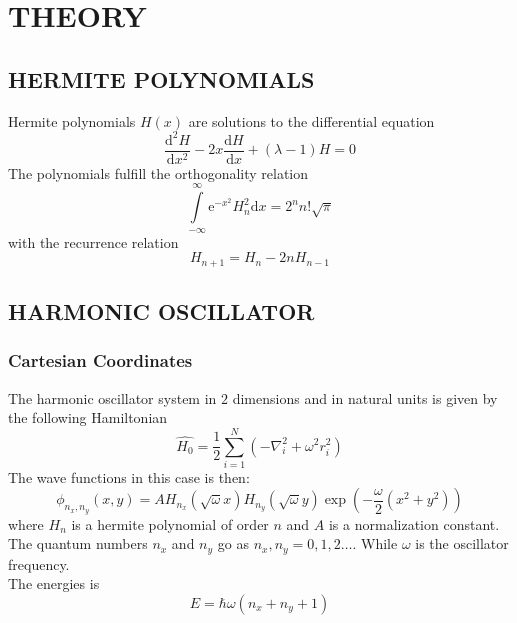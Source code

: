 \documentclass[a4paper, hidelinks, 10pt]{article}
\let\oldsection\section
\renewcommand{\section}[1]{\centering \oldsection{{#1}} \justifying}
\let\oldsubsection\subsection
\renewcommand{\subsection}[1]{\centering \oldsubsection{{#1}} \justifying}
\newcommand{\me}{\mathrm{e}} %
\newcommand{\md}{\mathrm{d}} %
\newcommand{\infint}{\int\limits^{\infty}_{-\infty}}
\begin{document}
\section{THEORY}
\label{sec:theory}

\subsection{HERMITE POLYNOMIALS}
\label{sub:hermite_polynomials}
    Hermite polynomials $H(x)$ are solutions to the differential equation
        \begin{equation}
            \frac{\md^2 H}{\md x^2} -2x\frac{\md H}{\md x} + \left(\lambda
            -1\right)H = 0
            \label{eq:hermitediffeq}
        \end{equation}
    The polynomials fulfill the orthogonality relation 
        \begin{equation}
            \infint \me^{-x^2}H^2_n\md x = 2^nn!\sqrt{\pi}
            \label{eq:hermiteOrth}
        \end{equation}
    with the recurrence relation
        \begin{equation}
            H_{n+1} = H_n - 2nH_{n-1}
            \label{eq:hermiteReq}
        \end{equation}

\subsection{HARMONIC OSCILLATOR}
\label{sub:harmonic_oscillator}
\subsubsection{Cartesian Coordinates}
\label{ssub:Cartesian Coordinates}
    The harmonic oscillator system in $2$ dimensions and in natural units is
    given by the following Hamiltonian
        \begin{equation}
            \hat{H_0} = \frac{1}{2}\sum^N_{i=1}\left(-\nabla^2_i + \omega^2
            r^2_i\right)
            \label{eq:cartHarmOsc}
        \end{equation}
    The wave functions in this case is then:
        \begin{equation}
            \phi_{n_x,n_y}(x,y) =
            AH_{n_x}(\sqrt{\omega}x)H_{n_y}(\sqrt{\omega}y)
            \exp(-\frac{\omega}{2}(x^2+y^2))
            \label{eq:cartUarmOscWavef}
        \end{equation}
    where $H_n$ is a hermite polynomial of order $n$ and $A$ is a normalization
    constant. The quantum numbers $n_x$ and $n_y$ go as $n_x,n_y=0,1,2\dots$.
    While $\omega$ is the oscillator frequency. \\
    The energies is 
        \begin{equation}
            E = \hbar\omega\left(n_x + n_y + 1\right)
            \label{eq:cartHarmOscE}
        \end{equation}
\end{document}
